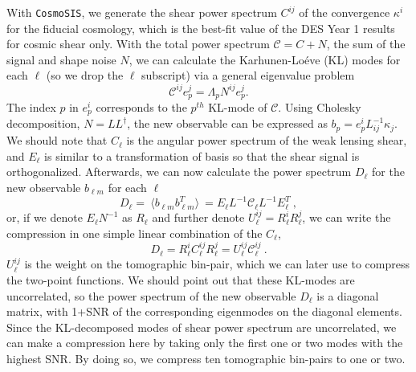 \documentclass[twocolumn]{\docclass}
\newcommand\be{\begin{equation}}
\newcommand\ee{\end{equation}}
\newcommand\ctot{\mathcal{C}}
\begin{document}
	With  {\tt CosmoSIS}, we generate the shear power spectrum $C^{ij}$ of the convergence $\kappa^i$ for the fiducial cosmology, which is the best-fit value of the DES Year 1 results for cosmic shear only. With the total power spectrum $\ctot=C+N$, the sum of the signal and shape noise $N$, we can calculate the Karhunen-Lo\'eve (KL) modes for each $\ell$ (so we drop the $\ell$ subscript) via a general eigenvalue problem 
	\be
	\ctot^{ij} e^j_p = \Lambda_p N^{ij} e^j_p
	.\ee
	The index $p$ in $e_p^i$ corresponds to the $p^{th}$ KL-mode of $\ctot$. Using Cholesky decomposition, $N = L L^{\dagger}$, the new observable can be expressed as $b_p = e_p^i  L^{-1}_{ij} \kappa_{j}$. We should note that $C_{\ell}$ is the angular power spectrum of the weak lensing shear, and $E_{\ell}$ is similar to a transformation of basis so that the shear signal is orthogonalized. Afterwards, we can now calculate the power spectrum $D_{\ell}$ for the new observable $b_{\ell m}$ for each $\ell$
	\be
	D_{\ell} =\ \langle b_{\ell m} b_{\ell m}^T \rangle \ = E_{\ell} L^{-1} \ctot_{\ell} L^{-1} E^{T}_{\ell}\
	,\ee
	or, if we denote $E_{\ell} N^{-1}$ as $R_{\ell}$ and further denote $U_{\ell}^{ij}=R^i_{\ell} R^j_{\ell}$, we can write the compression in one simple linear combination of the $C_{\ell}$,
	\be
	D_{\ell} = R_{\ell}^i C_{\ell}^{ij} R_{\ell}^j = U_{\ell}^{ij} \ctot_{\ell}^{ij}\
	.\ee
	$U_{\ell}^{ij}$ is the weight on the tomographic bin-pair, which we can later use to compress the two-point functions. We should point out that these KL-modes are uncorrelated, so the power spectrum of the new observable $D_{\ell}$ is a diagonal matrix, with 1+SNR of the corresponding eigenmodes on the diagonal elements. Since the KL-decomposed modes of shear power spectrum are uncorrelated, we can make a compression here by taking only the first one or two modes with the highest SNR. By doing so, we compress ten tomographic bin-pairs to one or two.
	
\end{document}
